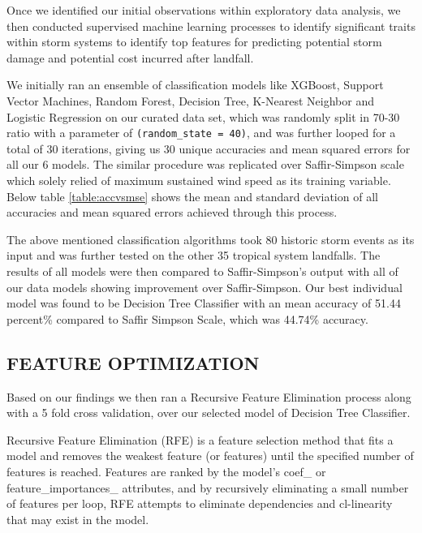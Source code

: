 \documentclass[letterpaper, 10 pt, conference]{ieeeconf}  %
\begin{document}
Once we identified our initial observations within exploratory data analysis, we then conducted supervised machine learning processes to identify significant traits within storm systems to identify top features for predicting potential storm damage and potential cost incurred after landfall.

We initially ran an ensemble of classification models like XGBoost, Support Vector Machines, Random Forest, Decision Tree, K-Nearest Neighbor and Logistic Regression on our curated data set, which was randomly split in 70-30 ratio with a parameter of \texttt{(random\_state = 40)}, and was further looped for a total of 30 iterations, giving us 30 unique accuracies and mean squared errors for all our 6 models. The similar procedure was replicated over Saffir-Simpson scale which solely relied of maximum sustained wind speed as its training variable. Below table \ref{table:accvsmse} shows the mean and standard  deviation of all accuracies and mean squared errors achieved through this process.

The above mentioned classification algorithms took 80 historic storm events as its input and was further tested on the other 35 tropical system landfalls. The results of all models were then compared to Saffir-Simpson’s output with all of  our data models showing improvement over Saffir-Simpson. Our best individual  model was found to be Decision Tree Classifier with an mean accuracy of 51.44 percent\% compared to Saffir Simpson Scale, which was  44.74\% accuracy.

\subsection{FEATURE OPTIMIZATION}
Based on our findings we then ran a Recursive Feature Elimination process along with a 5 fold cross validation, over our selected model of Decision Tree Classifier. 

Recursive Feature Elimination (RFE) is a feature selection method that fits a model and removes the weakest feature (or features) until the specified number of features is reached. Features are ranked by the model’s coef\_ or feature\_importances\_ attributes, and by recursively eliminating a small number of features per loop, RFE attempts to eliminate dependencies and cl-linearity that may exist in the model.
\end{document}
